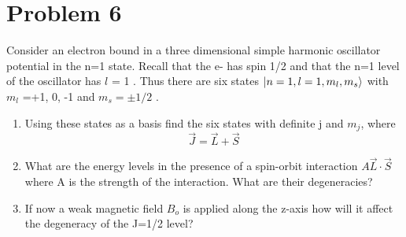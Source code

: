 \documentclass{article}
\begin{document}
\section*{Problem 6} 
Consider an electron bound in a three dimensional simple harmonic oscillator potential in the n=1 state. Recall that the e- has spin 1/2 and that the n=1 level of the oscillator has $l$ = 1 . Thus there are six states $\ket{n=1, l =1, m_l , m_s }$ with $m_l$ =+1, 0, -1 and $m_s = \pm 1/2$ .
\begin{enumerate}[label=\alph*)]
	\item %
	Using these states as a basis find the six states with definite j and $m_j$, where \\
	$$\vec{J} = \vec{L} + \vec{S}$$
	\item %
	What are the energy levels in the presence of a spin-orbit interaction $A\vec{L}\cdot \vec{S}$ where A is the strength of the interaction. What are their degeneracies?
	\item %
	If now a weak magnetic field $B_o$ is applied along the z-axis how will it affect the degeneracy of the J=1/2 level?
\end{enumerate}
\end{document}
